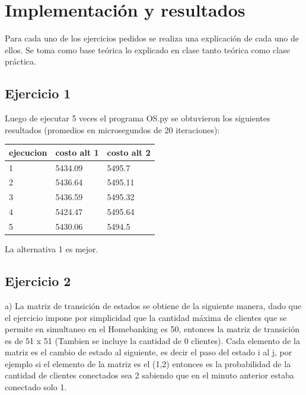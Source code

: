 \documentclass[11pt,a4paper]{article}
\begin{document}
\newpage


\section{Implementación y resultados}
Para cada uno de los ejercicios pedidos se realiza una explicación de cada uno de ellos. Se toma como base teórica lo explicado en clase tanto teórica como clase práctica.

	\subsection{Ejercicio 1}
	    Luego de ejecutar 5 veces el programa OS.py se obtuvieron los siguientes resultados (promedios en microsegundos de 20 iteraciones): 

		\begin{center}
		\begin{tabular}{ | m{4em} | m{2cm}| m{2cm} | } 
		\hline
		ejecucion & costo alt 1 & costo alt 2\\ 
		\hline
		1 & 5434.09 & 5495.7 \\ 
		\hline
		2 & 5436.64 & 5495.11 \\ 
		\hline
		\hline
		3 & 5436.59 & 5495.32 \\ 
		\hline
		\hline
		4 & 5424.47 & 5495.64 \\ 
		\hline
		\hline
		5 & 5430.06 & 5494.5 \\ 
		\hline
		\end{tabular}
		\end{center}

		La alternativa 1 es mejor.


\newpage

	\subsection{Ejercicio 2}
		a) La matriz de transición de estados se obtiene de la siguiente manera, dado que el ejercicio impone por simplicidad que la   cantidad máxima de clientes que se permite en simultaneo en el Homebanking es 50, entonces la matriz de transición es de 51 x 51 (Tambien se incluye la cantidad de 0 clientes). Cada elemento de la matriz es el cambio de estado al siguiente, es decir el paso del estado i al j, por ejemplo si el elemento de la matriz es el (1,2) entonces es la probabilidad de la cantidad de clientes conectados sea 2 sabiendo que en el minuto anterior estaba conectado solo 1.
		
\end{document}
